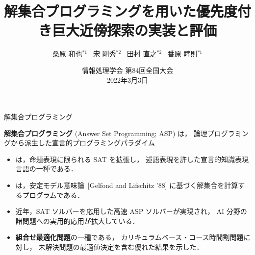 \documentclass[11pt,dvipdfmx]{beamer}
\title{解集合プログラミングを用いた優先度付き巨大近傍探索の実装と評価}
\author{桑原 和也$^{*1}$~
宋 剛秀$^{*2}$~
田村 直之$^{*2}$~
番原 睦則$^{*1}$}
\institute{名古屋大学$^{*1}$~
神戸大学$^{*2}$}
\date{情報処理学会 第84回全国大会\\2022年3月3日}
\begin{document}
\maketitle
\begin{frame}{解集合プログラミング}
  \begin{alertblock}{}\centering
    \alert{\bf 解集合プログラミング} (Answer Set Programming; ASP) は，
    論理プログラミングから派生した宣言的プログラミングパラダイム
  \end{alertblock}
  \bigskip
  \begin{itemize}
  \item {}は，命題表現に限られる SAT を拡張し，
    述語表現を許した宣言的知識表現言語の一種である．
  \item {}は，安定モデル意味論~[Gelfond and Lifschitz '88]
    に基づく解集合を計算するプログラムである．
  \item 近年，SAT ソルバーを応用した高速 ASP ソルバーが実現され，
    AI 分野の諸問題への実用的応用が拡大している．
  \item \alert{\bf 組合せ最適化問題}の一種である，
  カリキュラムベース・コース時間割問題に対し，
  未解決問題の最適値決定を含む優れた結果を示した．
  \end{itemize}
\end{frame}
\end{document}
